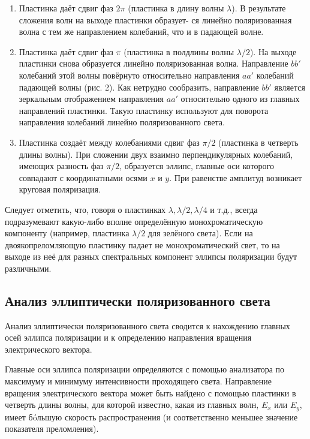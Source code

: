 \documentclass[12pt, a4paper]{article}
\begin{document}
\begin{enumerate}
    \item Пластинка даёт сдвиг фаз $ 2\pi $ (пластинка в длину волны $ \lambda $). В
          результате сложения волн на выходе пластинки образует- ся линейно
          поляризованная волна с тем же направлением колебаний, что и в падающей волне.
    \item Пластинка даёт сдвиг фаз $ \pi $ (пластинка в полдлины волны $ \lambda / 2 $).
          На выходе пластинки снова образуется линейно поляризованная волна. Направление
          $ bb' $ колебаний этой волны повёрнуто относительно направления $ aa' $
          колебаний падающей волны (рис. 2). Как нетрудно сообразить, направление $ bb' $
          является зеркальным отображением направления $ aa' $ относительно одного из
          главных направлений пластинки. Такую пластинку используют для поворота
          направления колебаний линейно поляризованного света.
    \item Пластинка создаёт между колебаниями сдвиг фаз $ \pi/2 $ (пластинка в четверть
          длины волны). При сложении двух взаимно перпендикулярных колебаний, имеющих
          разность фаз $ \pi/2 $, образуется эллипс, главные оси которого совпадают с
          координатными осями $ x $ и $ y $. При равенстве амплитуд возникает круговая
          поляризация.
\end{enumerate}

Следует отметить, что, говоря о пластинках $ \lambda , \lambda/2, \lambda/4 $ и
т.д., всегда подразумевают какую-либо вполне определённую монохроматическую
компоненту (например, пластинка $ \lambda/2 $ для зелёного света). Если на
двоякопреломляющую пластинку падает не монохроматический свет, то на выходе из
неё для разных спектральных компонент эллипсы поляризации будут различными.

\subsection{Анализ эллиптически поляризованного света}

Анализ эллиптически поляризованного света сводится к нахождению главных осей
эллипса поляризации и к определению направления вращения электрического
вектора.

Главные оси эллипса поляризации определяются с помощью анализатора по максимуму
и минимуму интенсивности проходящего света. Направление вращения электрического
вектора может быть найдено с помощью пластинки в четверть длины волны, для
которой известно, какая из главных волн, $ E_x $ или $ E_y $, имеет б\'{o}льшую
скорость распространения (и соответственно меньшее значение показателя
преломления).
\end{document}
